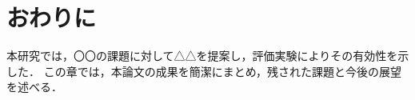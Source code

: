 \documentclass[main]{subfiles}
\begin{document}
\chapter{おわりに}
\label{chap:conclusion}
本研究では，〇〇の課題に対して△△を提案し，評価実験によりその有効性を示した．
この章では，本論文の成果を簡潔にまとめ，残された課題と今後の展望を述べる．\par
\end{document}
